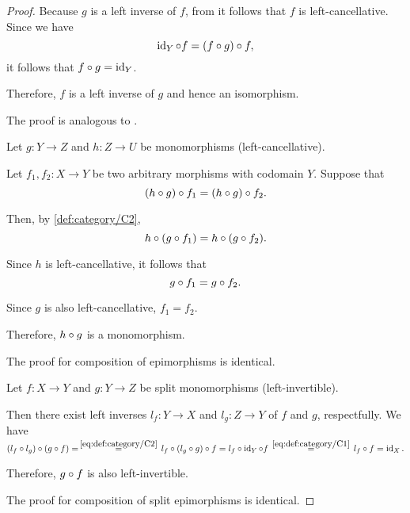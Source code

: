 \begin{proof}
  Because \( g \) is a left inverse of \( f \), from  it follows that \( f \) is left-cancellative. Since we have
  \begin{equation*}
    \id_Y \bincirc f
    =
    (f \bincirc g) \bincirc f,
  \end{equation*}
  it follows that \( f \bincirc g = \id_Y \).

  Therefore, \( f \) is a left inverse of \( g \) and hence an isomorphism.

   The proof is analogous to .

   Let \( g: Y \to Z \) and \( h: Z \to U \) be monomorphisms (left-cancellative).

  Let \( f_1, f_2: X \to Y \) be two arbitrary morphisms with codomain \( Y \). Suppose that
  \begin{equation*}
    (h \bincirc g) \bincirc f_1 = (h \bincirc g) \bincirc f_2.
  \end{equation*}

  Then, by \ref{def:category/C2},
  \begin{equation*}
    h \bincirc (g \bincirc f_1) = h \bincirc (g \bincirc f_2).
  \end{equation*}

  Since \( h \) is left-cancellative, it follows that
  \begin{equation*}
    g \bincirc f_1 = g \bincirc f_2.
  \end{equation*}

  Since \( g \) is also left-cancellative, \( f_1 = f_2 \).

  Therefore, \( h \bincirc g \) is a monomorphism.

  The proof for composition of epimorphisms is identical.

   Let \( f: X \to Y \) and \( g: Y \to Z \) be split monomorphisms (left-invertible).

  Then there exist left inverses \( l_f: Y \to X \) and \( l_g: Z \to Y \) of \( f \) and \( g \), respectfully. We have
  \begin{equation*}
    (l_f \bincirc l_g) \bincirc (g \bincirc f)
    =
    \reloset {\eqref{eq:def:category/C2}} =
    l_f \bincirc (l_g \bincirc g) \bincirc f
    =
    l_f \bincirc \id_Y \bincirc f
    \reloset {\eqref{eq:def:category/C1}} =
    l_f \bincirc f
    =
    \id_X.
  \end{equation*}

  Therefore, \( g \bincirc f \) is also left-invertible.

  The proof for composition of split epimorphisms is identical.
\end{proof}

